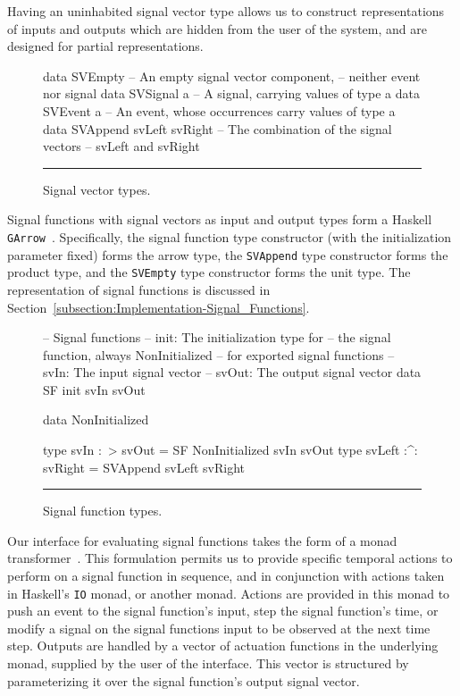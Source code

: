 Having an uninhabited signal vector type allows us to construct representations
of inputs and outputs which are hidden from the user of the system, and are
designed for partial representations.

\begin{figure}
\begin{code}
data SVEmpty    -- An empty signal vector component,
                -- neither event nor signal
data SVSignal a -- A signal, carrying values of type a
data SVEvent a  -- An event, whose occurrences carry values of type a
data SVAppend svLeft svRight -- The combination of the signal vectors
                             -- svLeft and svRight
\end{code}
\hrule
\caption{Signal vector types.}
\label{figure:signal_vector_types}
\end{figure}

Signal functions with signal vectors as input and output types form a
Haskell {\tt GArrow}~\cite{Megacz2011}. Specifically, the signal function
type constructor (with the initialization parameter fixed) forms the arrow
type, the {\tt SVAppend} type constructor forms the product type, and the
{\tt SVEmpty} type constructor forms the unit type.
%
The representation of signal functions is discussed in
Section~\ref{subsection:Implementation-Signal_Functions}.
\begin{figure}
\begin{code}
-- Signal functions
-- init: The initialization type for 
--   the signal function, always NonInitialized
--   for exported signal functions
-- svIn: The input signal vector
-- svOut: The output signal vector
data SF init svIn svOut

data NonInitialized

type svIn :~> svOut = SF NonInitialized svIn svOut
type svLeft :^: svRight = SVAppend svLeft svRight
\end{code}
\hrule
\caption{Signal function types.}
\label{figure:signal_function_types}
\end{figure}

Our interface for evaluating signal functions takes the form of a monad
transformer~\cite{Jones1995}. This formulation permits us to provide specific
temporal actions to perform on a signal function in sequence, and in conjunction
with actions taken in Haskell's {\tt IO} monad, or another monad. Actions are
provided in this monad to push an event to the signal function's input, step
the signal function's time, or modify a signal on the signal functions input to
be observed at the next time step. Outputs are handled by a vector  of actuation
functions in the underlying monad, supplied by the user of the interface. This
vector is structured by parameterizing it over the signal function's output
signal vector. 

